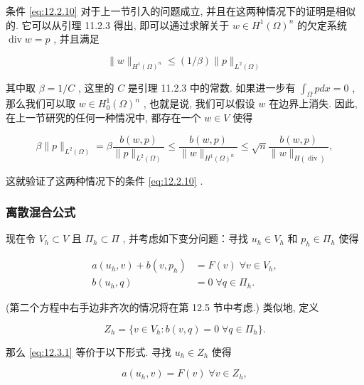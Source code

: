 条件 \eqref{eq:12.2.10} 对于上一节引入的问题成立, 并且在这两种情况下的证明是相似的. 它可以从引理 11.2.3 得出, 即可以通过求解关于 $w \in  {H}^{1}{\left( \Omega \right) }^{n}$ 的欠定系统 $\operatorname{div} w = p$ , 并且满足

$$
\| w\|_{{H}^{1}{\left( \Omega \right) }^{n}} \leq  \left( {1/\beta }\right) \| p\|_{{L}^{2}\left( \Omega \right) }
$$

其中取 $\beta  = 1/C$ , 这里的 $C$ 是引理 11.2.3 中的常数. 如果进一步有 $\int_{\Omega }{pdx} = 0$ , 那么我们可以取 $w \in  H_0^{1}{\left( \Omega \right)}^{n}$ , 也就是说, 我们可以假设 $w$ 在边界上消失. 因此, 在上一节研究的任何一种情况中, 都存在一个 $w \in  V$ 使得

$$
\beta \| p\|_{{L}^{2}\left( \Omega \right) } = \beta \frac{b\left( {w,p}\right) }{\| p\|_{{L}^{2}\left( \Omega \right) }} \leq  \frac{b\left( {w,p}\right) }{\| w\|_{{H}^{1}{\left( \Omega \right) }^{n}}} \leq  \sqrt{n}\frac{b\left( {w,p}\right) }{\| w\|_{H\left( \operatorname{div}\right) }},
$$

这就验证了这两种情况下的条件 \eqref{eq:12.2.10} .


\subsubsection{离散混合公式}

现在令 $V_{h} \subset V$ 且 $\varPi_{h} \subset \varPi$ , 并考虑如下变分问题：寻找 $u_{h} \in V_{h}$ 和 $p_{h} \in \varPi_{h}$ 使得

\begin{equation}\label{eq:12.3.1}
\begin{aligned}
a(u_{h},v) + b(v,p_{h}) &= F(v) \;\forall v \in V_{h}, \\
b(u_{h},q) &= 0 \;\forall q \in \varPi_{h}.
\end{aligned}
\end{equation}

(第二个方程中右手边非齐次的情况将在第 12.5 节中考虑.) 类似地, 定义

\begin{equation}\label{eq:12.3.2}
Z_{h} = \{ v \in V_{h} : b(v,q) = 0 \;\forall q \in \varPi_{h} \} .
\end{equation}

那么 \eqref{eq:12.3.1} 等价于以下形式. 寻找 $u_{h} \in Z_{h}$ 使得

\begin{equation}\label{eq:12.3.3}
a(u_{h},v) = F(v) \;\forall v \in Z_{h},
\end{equation}

